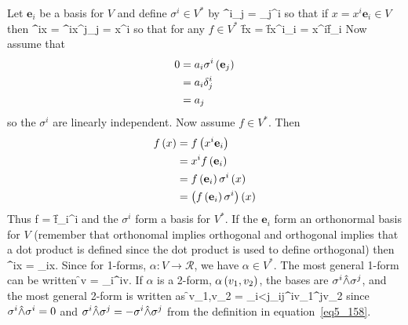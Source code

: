 Let $\mathbf{e}_{i}$ be a basis for $V$ and define $\sigma^{i} \in V^{*}$ by
\be
	\f{\sigma^{i}}{_{j}} = \delta_{j}^{i}
\ee
so that if $x = x^{i}\mathbf{e}_{i} \in V$ then
\be
	\f{\sigma^{i}}{x} =  \f{\sigma^{i}}{x^{j}_{j}} = x^{i} 
\ee
so that for any $f \in V^{*}$
\be
	\f{f}{x} = \f{f}{x^{i}_{i}} = x^{i}\f{f}{_{i}}
\ee
Now assume that
\begin{align}
	0 &= a_{i}{\sigma^{i}}\left ( {\mathbf{e}_{j}} \right ) \\
	  &= a_{i}\delta_{j}^{i} \\
	  &= a_{j} 
\end{align}
so the $\sigma^{i}$ are linearly independent. Now assume $f \in V^{*}$.  Then
\begin{align}
	{f}\left ( {x} \right ) &= {f}\left ( {x^{i}\mathbf{e}_{i}} \right ) \\
	         &= x^{i}{f}\left ( {\mathbf{e}_{i}} \right ) \\
	         &= {f}\left ( {\mathbf{e}_{i}} \right ){\sigma^{i}}\left ( {x} \right ) \\
	         &= {\left ( {{f}\left ( {\mathbf{e}_{i}} \right )\sigma^{i}} \right )}\left ( {x} \right )
\end{align}
Thus
\be
	f = \f{f}{_{i}}\sigma^{i}
\ee
and the $\sigma^{i}$ form a basis for $V^{*}$.  If the $\mathbf{e}_{i}$ form an 
orthonormal basis for $V$ (remember that orthonomal implies orthogonal and orthogonal
implies that a dot product is defined since the dot product is used to define orthogonal) then
\be
	\f{\sigma^{i}}{x} = _{i}\cdot x.
\ee
Since for 1-forms, $\alpha:V\rightarrow\mathcal{R}$, we have $\alpha\in V^{*}$.  The most
general 1-form can be written
\be
	\f{\alpha}{v} = \alpha_{i}\f{\sigma^{i}}{v}.
\ee
If $\alpha$ is a 2-form, ${\alpha}\left ( {v_{1},v_{2}} \right )$, the bases are $\sigma^{i}\hat{\wedge}\sigma^{j}$, and
the most general 2-form is written as
\be
	\f{\alpha}{v_{1},v_{2}} = \sum_{i<j}\alpha_{ij}\f{\sigma^{i}}{v_{1}}\Wbld\f{\sigma^{j}}{v_{2}}	
\ee
since $\sigma^{i}\hat{\wedge}\sigma^{i}=0$ and $\sigma^{i}\hat{\wedge}\sigma^{j}=-\sigma^{i}\hat{\wedge}\sigma^{j}$ from
the definition in equation~\ref{eq5_158}.

